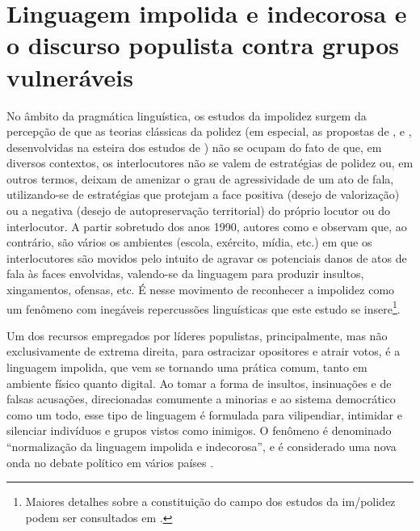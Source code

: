\documentclass[portuguese]{textolivre}
\begin{document}
\section{Linguagem impolida e indecorosa e o discurso populista contra grupos vulneráveis}\label{sec-1}
No âmbito da pragmática linguística, os estudos da impolidez surgem da percepção de que as teorias clássicas da polidez (em especial, as propostas de \textcite{brown1987}, \textcite{leech1983} e \textcite{lakoff1975}, desenvolvidas na esteira dos estudos de \textcite{goffman1967}) não se ocupam do fato de que, em diversos contextos, os interlocutores não se valem de estratégias de polidez ou, em outros termos, deixam de amenizar o grau de agressividade de um ato de fala, utilizando-se de estratégias que protejam a face positiva (desejo de valorização) ou a negativa (desejo de autopreservação territorial) do próprio locutor ou do interlocutor. A partir sobretudo dos anos 1990, autores como \textcite{culpeper2011} e \textcite{bousfield2007} observam que, ao contrário, são vários os ambientes (escola, exército, mídia, etc.) em que os interlocutores são movidos pelo intuito de agravar os potenciais danos de atos de fala às faces envolvidas, valendo-se da linguagem para produzir insultos, xingamentos, ofensas, etc. É nesse movimento de reconhecer a impolidez como um fenômeno com inegáveis repercussões linguísticas que este estudo se insere\footnote{Maiores detalhes sobre a constituição do campo dos estudos da im/polidez podem ser consultados em \textcite{cunha2020}.}.

Um dos recursos empregados por líderes populistas, principalmente, mas não exclusivamente de extrema direita, para ostracizar opositores e atrair votos, é a linguagem impolida, que vem se tornando uma prática comum, tanto em ambiente físico quanto digital. Ao tomar a forma de insultos, insinuações e de falsas acusações, direcionadas comumente a minorias e ao sistema democrático como um todo, esse tipo de linguagem é formulada para vilipendiar, intimidar e silenciar indivíduos e grupos vistos como inimigos. O fenômeno é denominado “normalização da linguagem impolida e indecorosa”, e é considerado uma nova onda no debate político em vários países \cite{wodak2021culpeper}.
\end{document}
